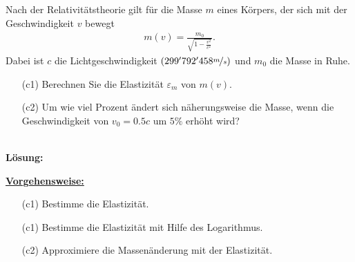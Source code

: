 \subsection*{}
Nach der Relativitätstheorie gilt für die Masse $ m $ eines Körpers, der sich mit der Geschwindigkeit $ v $ bewegt
\begin{align*}
	m(v)
	=
	\frac{m_0}{\sqrt{1 - \frac{v^2}{c^2}}}.
\end{align*}
Dabei ist $ c $ die Lichtgeschwindigkeit $ (299'792'458 \nicefrac{m}{s}) $ und $ m_0 $ die Masse in Ruhe.
\begin{enumerate}
	\item[(c1)] Berechnen Sie die Elastizität $ \varepsilon_m $ von $ m(v) $.
	\item[(c2)] Um wie viel Prozent ändert sich näherungsweise die Masse, wenn die Geschwindigkeit von $ v_0 = 0.5c $ um $ 5 \% $ erhöht wird?
\end{enumerate}
\ \\
\textbf{Lösung:}
\begin{mdframed}
\underline{\textbf{Vorgehensweise:}}
\begin{enumerate}
\item[(c1)] Bestimme die Elastizität.
\item[(c1)] Bestimme die Elastizität mit Hilfe des Logarithmus.
\item[(c2)] Approximiere die Massenänderung mit der Elastizität.
\end{enumerate}
\end{mdframed}

